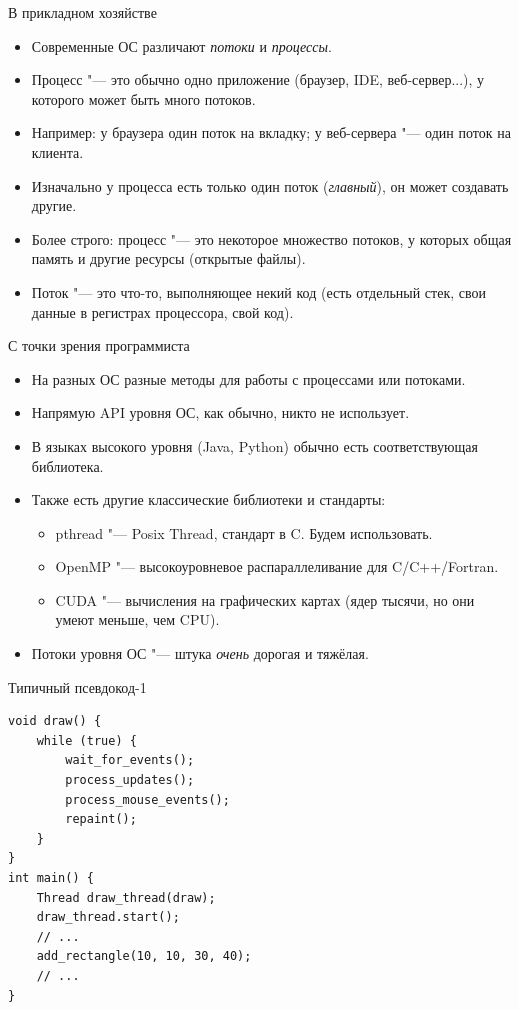 \begin{frame}{В прикладном хозяйстве}
	\begin{itemize}
		\item Современные ОС различают \textit{потоки} и \textit{процессы}.
		\item Процесс "--- это обычно одно приложение (браузер, IDE, веб-сервер...), у которого может быть много потоков.
		\item Например: у браузера один поток на вкладку; у веб-сервера "--- один поток на клиента.
		\item Изначально у процесса есть только один поток (\textit{главный}), он может создавать другие.
		\item Более строго: процесс "--- это некоторое множество потоков, у которых общая память и другие ресурсы (открытые файлы).
		\item Поток "--- это что-то, выполняющее некий код (есть отдельный стек, свои данные в регистрах процессора, свой код).\
	\end{itemize}
\end{frame}

\begin{frame}{С точки зрения программиста}
	\begin{itemize}
		\item На разных ОС разные методы для работы с процессами или потоками.
		\item Напрямую API уровня ОС, как обычно, никто не использует.
		\item В языках высокого уровня (Java, Python) обычно есть соответствующая библиотека.
		\item Также есть другие классические библиотеки и стандарты:
			\begin{itemize}
				\item pthread "--- Posix Thread, стандарт в C. Будем использовать.
				\item OpenMP "--- высокоуровневое распараллеливание для C/C++/Fortran.
				\item CUDA "--- вычисления на графических картах (ядер тысячи, но они умеют меньше, чем CPU).
			\end{itemize}
		\item Потоки уровня ОС "--- штука \textit{очень} дорогая и тяжёлая.
	\end{itemize}
\end{frame}

\begin{frame}[fragile]{Типичный псевдокод-1}
\begin{verbatim}
void draw() {
    while (true) {
        wait_for_events();
        process_updates();
        process_mouse_events();
        repaint();
    }
}
int main() {
    Thread draw_thread(draw);
    draw_thread.start();
    // ...
    add_rectangle(10, 10, 30, 40);
    // ...
}
\end{verbatim}
\end{frame}

